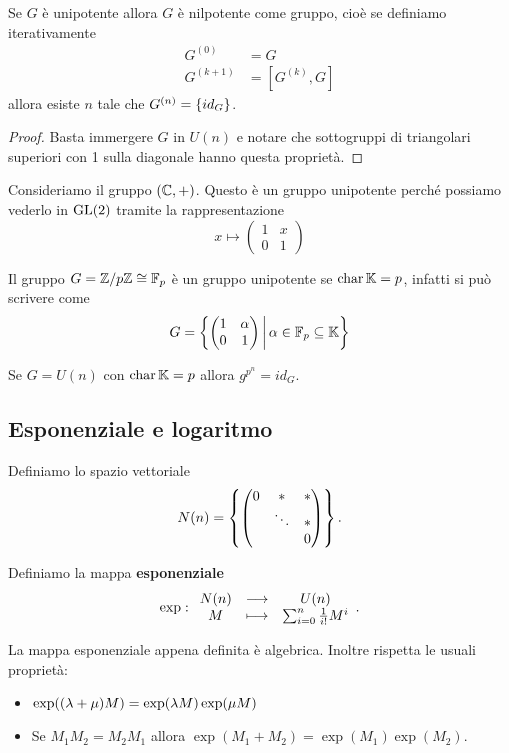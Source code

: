 \begin{corollary}
    Se $G$ \`e unipotente allora $G$ \`e nilpotente come gruppo, cio\`e se definiamo iterativamente 
    \begin{align*}
    G^{(0)}\;\;\;\,&=G \\
    G^{(k+1)}&=[G^{(k)},G] 
    \end{align*} 
    allora esiste $n$ tale che $G^{(n)}=\left\{ id_G\right\}$.
\end{corollary}
\begin{proof}
Basta immergere $G$ in $U(n)$ e notare che sottogruppi di triangolari superiori con 1 sulla diagonale hanno questa propriet\`a.
\end{proof}

\begin{example}
Consideriamo il gruppo $(\mathbb{C},+)$. Questo è un gruppo unipotente perché possiamo vederlo in $\operatorname{GL}(2)$ tramite la rappresentazione 
\[x\mapsto \begin{pmatrix}
1 & x \\ 0 & 1 
\end{pmatrix}\]
\end{example}

\begin{example}
Il gruppo $G={\mathbb{Z}/{p}\mathbb{Z}}\cong \mathbb{F}_p$ \`e un gruppo unipotente se $\operatorname{char} \mathbb{K}=p$, infatti si pu\`o scrivere come
\[G=\left\{ \begin{pmatrix}1&\alpha\\0&1\end{pmatrix}\,\middle|\, \alpha\in\mathbb{F}_p\subseteq\mathbb{K}\right\}\]
\end{example}
\begin{remark}
Se $G=U(n)$ con $\operatorname{char} \mathbb{K}=p$ allora $g^{p^n}=id_G$.
\end{remark}

\subsection{Esponenziale e logaritmo}

\begin{notation}
Definiamo lo spazio vettoriale
\[N(n)=\left\{ \begin{pmatrix}0&\ast&\ast\\&\ddots&\ast\\&&0\end{pmatrix}\right\}.\]
\end{notation}

\begin{definition}[Esponenziale]
Definiamo la mappa \textbf{esponenziale}
\[\exp:\begin{array}{ccc} {N(n)} & \longrightarrow & {U(n)}\\ {M} & \longmapsto & {\sum_{i=0}^n\frac1{i!}M^i} \end{array}.\]
\end{definition}
\begin{remark}
La mappa esponenziale appena definita \`e algebrica. Inoltre rispetta le usuali propriet\`a:
\begin{itemize}
    \item $\exp((\lambda+\mu)M)=\exp(\lambda M)\exp(\mu M)$
    \item Se $M_1M_2=M_2M_1$ allora $\exp(M_1+M_2)=\exp(M_1)\exp(M_2)$.
\end{itemize}
\end{remark}

